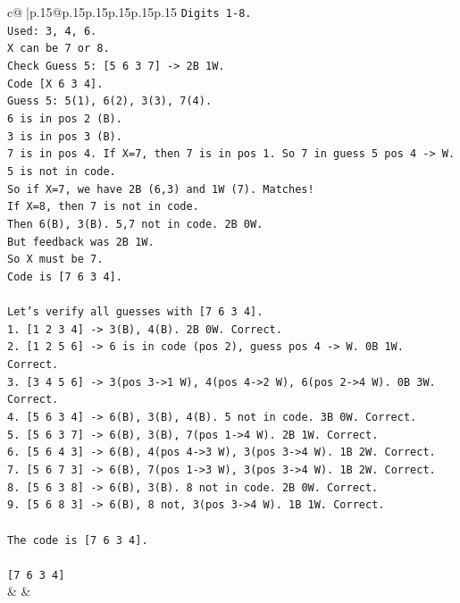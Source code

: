 \documentclass{article}
\begin{document}
{\begin{supertabular}{c@{$\;$}|p{.15\linewidth}@{}p{.15\linewidth}p{.15\linewidth}p{.15\linewidth}p{.15\linewidth}p{.15\linewidth}}
{{{\texttt{Digits 1{-}8.} \\
\texttt{Used: 3, 4, 6.} \\
\texttt{X can be 7 or 8.} \\
\texttt{Check Guess 5: {[}5 6 3 7{]} {-}> 2B 1W.} \\
\texttt{Code {[}X 6 3 4{]}.} \\
\texttt{Guess 5: 5(1), 6(2), 3(3), 7(4).} \\
\texttt{6 is in pos 2 (B).} \\
\texttt{3 is in pos 3 (B).} \\
\texttt{7 is in pos 4. If X=7, then 7 is in pos 1. So 7 in guess 5 pos 4 {-}> W.} \\
\texttt{5 is not in code.} \\
\texttt{So if X=7, we have 2B (6,3) and 1W (7). Matches!} \\
\texttt{If X=8, then 7 is not in code.} \\
\texttt{Then 6(B), 3(B). 5,7 not in code. 2B 0W.} \\
\texttt{But feedback was 2B 1W.} \\
\texttt{So X must be 7.} \\
\texttt{Code is {[}7 6 3 4{]}.} \\
\\ 
\texttt{Let's verify all guesses with {[}7 6 3 4{]}.} \\
\texttt{1. {[}1 2 3 4{]} {-}> 3(B), 4(B). 2B 0W. Correct.} \\
\texttt{2. {[}1 2 5 6{]} {-}> 6 is in code (pos 2), guess pos 4 {-}> W. 0B 1W. Correct.} \\
\texttt{3. {[}3 4 5 6{]} {-}> 3(pos 3{-}>1 W), 4(pos 4{-}>2 W), 6(pos 2{-}>4 W). 0B 3W. Correct.} \\
\texttt{4. {[}5 6 3 4{]} {-}> 6(B), 3(B), 4(B). 5 not in code. 3B 0W. Correct.} \\
\texttt{5. {[}5 6 3 7{]} {-}> 6(B), 3(B), 7(pos 1{-}>4 W). 2B 1W. Correct.} \\
\texttt{6. {[}5 6 4 3{]} {-}> 6(B), 4(pos 4{-}>3 W), 3(pos 3{-}>4 W). 1B 2W. Correct.} \\
\texttt{7. {[}5 6 7 3{]} {-}> 6(B), 7(pos 1{-}>3 W), 3(pos 3{-}>4 W). 1B 2W. Correct.} \\
\texttt{8. {[}5 6 3 8{]} {-}> 6(B), 3(B). 8 not in code. 2B 0W. Correct.} \\
\texttt{9. {[}5 6 8 3{]} {-}> 6(B), 8 not, 3(pos 3{-}>4 W). 1B 1W. Correct.} \\
\\ 
\texttt{The code is {[}7 6 3 4{]}.} \\
\\ 
\texttt{{[}7 6 3 4{]}} \\
            }
        }
    }
    & & \\ \\


\end{supertabular}}
\end{document}
